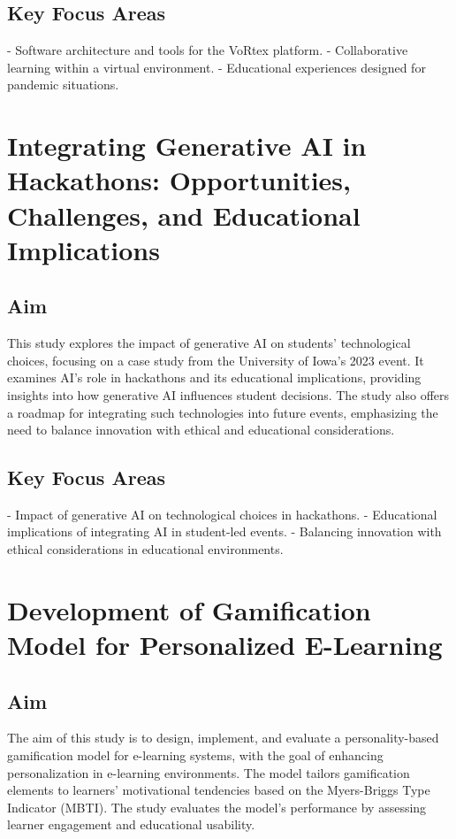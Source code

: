 \documentclass{article}
\begin{document}
\subsection{Key Focus Areas}
- Software architecture and tools for the VoRtex platform.
- Collaborative learning within a virtual environment.
- Educational experiences designed for pandemic situations.

\newpage
\section{Integrating Generative AI in Hackathons: Opportunities, Challenges, and Educational Implications}

\subsection{Aim}
This study explores the impact of generative AI on students' technological choices, focusing on a case study from the University of Iowa's 2023 event. It examines AI's role in hackathons and its educational implications, providing insights into how generative AI influences student decisions. The study also offers a roadmap for integrating such technologies into future events, emphasizing the need to balance innovation with ethical and educational considerations.

\subsection{Key Focus Areas}
- Impact of generative AI on technological choices in hackathons.
- Educational implications of integrating AI in student-led events.
- Balancing innovation with ethical considerations in educational environments.

\newpage
\section{Development of Gamification Model for Personalized E-Learning}

\subsection{Aim}
The aim of this study is to design, implement, and evaluate a personality-based gamification model for e-learning systems, with the goal of enhancing personalization in e-learning environments. The model tailors gamification elements to learners' motivational tendencies based on the Myers-Briggs Type Indicator (MBTI). The study evaluates the model's performance by assessing learner engagement and educational usability.
\end{document}

